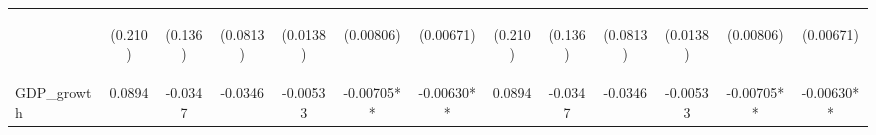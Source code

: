 \documentclass[]{article}
\begin{document}
\begin{center}
\begin{tabular}{lcccccccccccc}
\vspace{4pt} & \begin{footnotesize}(0.210)\end{footnotesize} & \begin{footnotesize}(0.136)\end{footnotesize} & \begin{footnotesize}(0.0813)\end{footnotesize} & \begin{footnotesize}(0.0138)\end{footnotesize} & \begin{footnotesize}(0.00806)\end{footnotesize} & \begin{footnotesize}(0.00671)\end{footnotesize} & \begin{footnotesize}(0.210)\end{footnotesize} & \begin{footnotesize}(0.136)\end{footnotesize} & \begin{footnotesize}(0.0813)\end{footnotesize} & \begin{footnotesize}(0.0138)\end{footnotesize} & \begin{footnotesize}(0.00806)\end{footnotesize} & \begin{footnotesize}(0.00671)\end{footnotesize} \\
GDP\_growth & 0.0894 & -0.0347 & -0.0346 & -0.00533 & -0.00705** & -0.00630** & 0.0894 & -0.0347 & -0.0346 & -0.00533 & -0.00705** & -0.00630** \\

\end{tabular}
\end{center}
\end{document}
